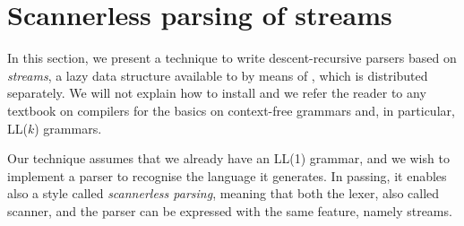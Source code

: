 \section{Scannerless parsing of streams}

In this section, we present a technique to write
descent\hyp{}recursive parsers based on \emph{streams}, a lazy data
structure available to \OCaml by means of \CamlpF, which is
distributed separately. We will not explain how to install \CamlpF and
we refer the reader to any textbook on compilers for the basics on
context\hyp{}free grammars and, in particular, LL($k$) grammars.

Our technique assumes that we already have an LL(1) grammar, and we
wish to implement a parser to recognise the language it generates. In
passing, it enables also a style called \emph{scannerless parsing},
meaning that both the lexer, also called scanner, and the parser can
be expressed with the same feature, namely streams.

